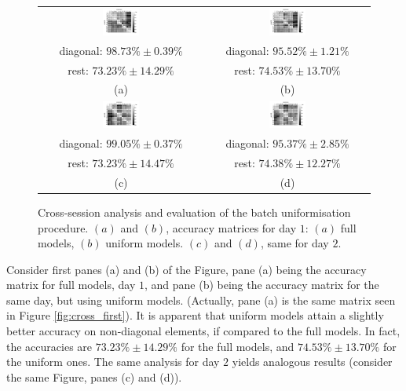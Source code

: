 \begin{figure}[!ht] \centering
  \begin{tabular}{cc}
    \includegraphics[width=0.23\textwidth]{figs/fig_resCross1_full.png} &
    \includegraphics[width=0.23\textwidth]{figs/fig_resCross1.png} \\
    diagonal: $98.73\% \pm 0.39\%$  & diagonal: $95.52\% \pm 1.21\%$ \\
        rest: $73.23\% \pm 14.29\%$ & rest: $74.53\% \pm 13.70\%$ \\
    (a) & (b) \\[5mm]
    \includegraphics[width=0.23\textwidth]{figs/fig_resCross2_full.png} &
    \includegraphics[width=0.23\textwidth]{figs/fig_resCross2.png} \\
    diagonal: $99.05\% \pm 0.37\%$ & diagonal: $95.37\% \pm 2.85\%$ \\
        rest: $73.23\% \pm 14.47\%$ & rest: $74.38\% \pm 12.27\%$ \\
    (c) & (d) \\
  \end{tabular}
  \caption{Cross-session analysis and evaluation of the batch uniformisation
    procedure. $(a)$ and $(b)$, accuracy matrices for day $1$: $(a)$
    full models, $(b)$ uniform models. $(c)$ and $(d)$, same for day $2$.}
  \label{fig:cross_initial}
\end{figure}

Consider first panes (a) and (b) of the Figure, pane (a) being the
accuracy matrix for full models, day $1$, and pane (b) being the
accuracy matrix for the same day, but using uniform models. (Actually,
pane (a) is the same matrix seen in Figure \ref{fig:cross_first}). It
is apparent that uniform models attain a slightly better accuracy on
non-diagonal elements, if compared to the full models. In fact, the
accuracies are $73.23\% \pm 14.29\%$ for the full models, and $74.53\%
\pm 13.70\%$ for the uniform ones. The same analysis for day $2$
yields analogous results (consider the same Figure, panes (c) and
(d)).

